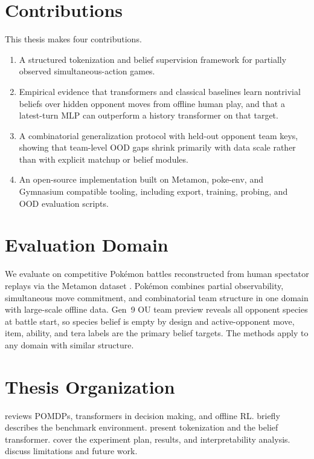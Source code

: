 \section{Contributions}

This thesis makes four contributions.
\begin{enumerate}
  \item A structured tokenization and belief supervision framework for
    partially observed simultaneous-action games.
  \item Empirical evidence that transformers and classical baselines learn
    nontrivial beliefs over hidden opponent moves from offline human play, and
    that a latest-turn MLP can outperform a history transformer on that target.
  \item A combinatorial generalization protocol with held-out opponent team keys,
    showing that team-level OOD gaps shrink primarily with data scale rather than
    with explicit matchup or belief modules.
  \item An open-source implementation built on Metamon, poke-env, and Gymnasium
    compatible tooling, including export, training, probing, and OOD evaluation
    scripts.
\end{enumerate}

\section{Evaluation Domain}

We evaluate on competitive Pok\'emon battles reconstructed from human spectator
replays via the Metamon dataset \citep{grigsby2023metamon,grigsby2025metamon}.
Pok\'emon combines partial observability, simultaneous move commitment, and
combinatorial team structure in one domain with large-scale offline data. Gen~9
OU team preview reveals all opponent species at battle start, so species belief
is empty by design and active-opponent move, item, ability, and tera labels are
the primary belief targets. The methods apply to any domain with similar
structure.

\section{Thesis Organization}

 reviews POMDPs, transformers in decision making, and
offline RL.  briefly describes the benchmark environment.
 present tokenization and the belief
transformer.  cover the experiment
plan, results, and interpretability analysis. 
discuss limitations and future work.
